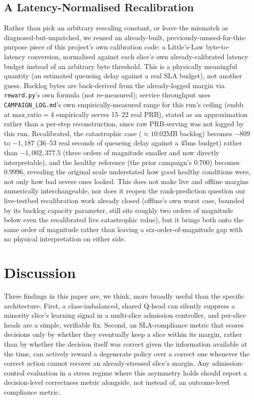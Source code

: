 \documentclass[journal]{IEEEtran}
\begin{document}
\subsection{A Latency-Normalised Recalibration}
Rather than pick an arbitrary rescaling constant, or leave the
mismatch as diagnosed-but-unpatched, we reused an already-built,
previously-unused-for-this-purpose piece of this project's own
calibration code: a Little's-Law byte-to-latency conversion, normalised
against each slice's own already-calibrated latency budget instead of
an arbitrary byte threshold. This is a physically meaningful quantity (an
estimated queueing delay against a real SLA budget), not another guess.
Backlog bytes are back-derived from the already-logged margin via
\texttt{reward.py}'s own formula (not re-measured); service throughput
uses \texttt{CAMPAIGN\_LOG.md}'s own empirically-measured range for this
run's ceiling (embb at $\text{max\_ratio}=4$ empirically serves
15--22 real PRB), stated as an approximation rather than a per-step
reconstruction, since raw PRB-serving was not logged by this run.
Recalibrated, the catastrophic case ($\approx 10.02$MB backlog) becomes
$-809$ to $-1{,}187$ (36--53 real seconds of queueing delay against a
45ms budget) rather than $-1{,}002{,}377.5$ (three orders of magnitude
smaller and now directly interpretable), and the healthy reference
(the prior campaign's $0.700$) becomes $0.9996$, revealing the original
scale understated how good healthy conditions were, not only how bad
severe ones looked. This does not make live and offline margins
numerically interchangeable, nor does it reopen the rank-prediction
question our live-testbed recalibration work already closed (offline's
own worst case, bounded by its backlog capacity parameter, still sits
roughly two orders of magnitude below even the recalibrated live
catastrophic value), but it brings both onto the same order of
magnitude rather than leaving a six-order-of-magnitude gap with no
physical interpretation on either side.

\section{Discussion}
Three findings in this paper are, we think, more broadly useful than
the specific architecture. First, a class-imbalanced, shared Q-head
can silently suppress a minority slice's learning signal in a
multi-slice admission controller, and per-slice heads are a simple,
verifiable fix. Second, an SLA-compliance metric that scores decisions
only by whether they eventually keep a slice within its margin, rather
than by whether the decision itself was correct given the information
available at the time, can actively reward a degenerate policy over a
correct one whenever the correct action cannot recover an
already-stressed slice's margin. Any admission-control evaluation in a
stress regime where this asymmetry holds should report a
decision-level correctness metric alongside, not instead of, an
outcome-level compliance metric.
\end{document}
